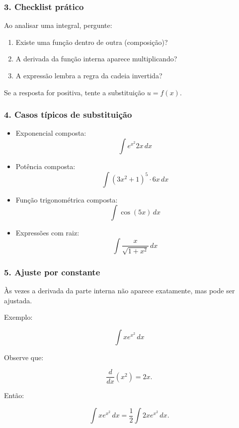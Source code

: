 \subsubsection*{3. Checklist prático}

Ao analisar uma integral, pergunte:

\begin{enumerate}
    \item Existe uma função dentro de outra (composição)?
    \item A derivada da função interna aparece multiplicando?
    \item A expressão lembra a regra da cadeia invertida?
\end{enumerate}

Se a resposta for positiva, tente a substituição \(u=f(x)\).

\subsubsection*{4. Casos típicos de substituição}

\begin{itemize}
    \item Exponencial composta:
    \[
    \int e^{x^2} 2x\,dx
    \]

    \item Potência composta:
    \[
    \int (3x^2+1)^5 \cdot 6x\,dx
    \]

    \item Função trigonométrica composta:
    \[
    \int \cos(5x)\,dx
    \]

    \item Expressões com raiz:
    \[
    \int \frac{x}{\sqrt{1+x^2}}\,dx
    \]
\end{itemize}

\subsubsection*{5. Ajuste por constante}

Às vezes a derivada da parte interna não aparece exatamente, mas pode ser ajustada.

Exemplo:

\[
\int x e^{x^2}\,dx
\]

Observe que:

\[
\frac{d}{dx}(x^2)=2x.
\]

Então:

\[
\int x e^{x^2}\,dx
=
\frac{1}{2} \int 2x e^{x^2}\,dx.
\]

